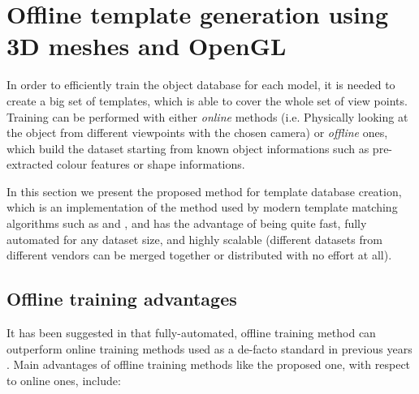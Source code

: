 \section{Offline template generation using 3D meshes and OpenGL} \label{sec:training}
In order to efficiently train the object database for each model, it is needed
to create a big set of templates, which is able to cover the whole set of view
points. Training can be performed with either \emph{online} methods (i.e.
Physically looking at the object from different viewpoints with the chosen
camera) or \emph{offline} ones, which build the dataset starting from known
object informations such as pre-extracted colour features or shape informations.

In this section we present the proposed method for template database
creation, which is an implementation of the method used by modern template
matching algorithms such as \cite{linemod-paper} and \cite{TODO}, and
has the advantage of being quite fast, fully automated for any dataset size,
and highly scalable (different datasets from different vendors can be merged
together or distributed with no effort at all).

\subsection{Offline training advantages}
It has been suggested in \cite{TODO} that fully-automated, offline training method can
outperform online training methods used as a de-facto standard
in previous years \cite{TODO}. Main advantages of offline training methods like
the proposed one, with respect
to online ones, include:

